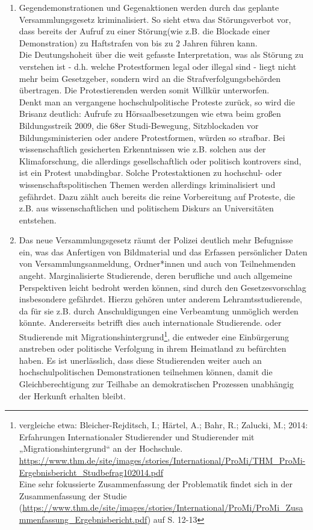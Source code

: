 \documentclass[DIV=calc]{scrartcl}
\let\oldgrqq=\grqq
\def\grqq{\oldgrqq\xspace}
\begin{document}
\begin{enumerate}
\item Gegendemonstrationen und Gegenaktionen werden durch das geplante Versammlungsgesetz kriminalisiert. So sieht etwa das \glqq Störungsverbot\grqq vor, dass bereits der Aufruf zu einer \glqq Störung\grqq (wie z.B. die Blockade einer Demonstration) zu Haftstrafen von bis zu 2 Jahren führen kann.\\
Die Deutungshoheit über die weit gefasste Interpretation, was als Störung zu verstehen ist - d.h. welche Protestformen legal oder illegal sind - liegt nicht mehr beim Gesetzgeber, sondern wird an die Strafverfolgungsbehörden übertragen. Die Protestierenden werden somit Willkür unterworfen.\\ 
Denkt man an vergangene hochschulpolitische Proteste zurück, so wird die Brisanz deutlich: Aufrufe zu Hörsaalbesetzungen wie etwa beim großen Bildungsstreik 2009, die 68er Studi-Bewegung, Sitzblockaden vor Bildungsministerien oder andere Protestformen, würden so strafbar.  Bei wissenschaftlich gesicherten Erkenntnissen wie z.B. solchen aus der Klimaforschung, die allerdings gesellschaftlich oder politisch kontrovers sind, ist ein Protest unabdingbar. Solche Protestaktionen zu hochschul- oder wissenschaftspolitischen Themen werden allerdings kriminalisiert und gefährdet. Dazu zählt auch bereits die reine Vorbereitung auf Proteste, die z.B. aus wissenschaftlichen und politischem Diskurs an Universitäten entstehen. \newpage
\item Das neue Versammlungsgesetz räumt der Polizei deutlich mehr Befugnisse ein, was das Anfertigen von Bildmaterial und das Erfassen persönlicher Daten von Versammlungsanmeldung, Ordner*innen und auch von Teilnehmenden angeht. Marginalisierte Studierende, deren berufliche und auch allgemeine Perspektiven leicht bedroht werden können, sind durch den Gesetzesvorschlag insbesondere gefährdet. Hierzu gehören unter anderem Lehramtsstudierende, da für sie z.B. durch Anschuldigungen eine Verbeamtung unmöglich werden könnte. Andererseits betrifft dies auch internationale Studierende. oder Studierende mit Migrationshintergrund\footnote{vergleiche etwa: Bleicher-Rejditsch, I.; Härtel, A.; Bahr, R.; Zalucki, M.; 2014: Erfahrungen Internationaler Studierender und Studierender mit „Migrationshintergrund“ an der Hochschule. \url{https://www.thm.de/site/images/stories/International/ProMi/THM_ProMi-Ergebnisbericht_Studbefrag102014.pdf} \\ Eine sehr fokussierte Zusammenfassung der Problematik findet sich in der Zusammenfassung der Studie (\url{https://www.thm.de/site/images/stories/International/ProMi/ProMi_Zusammenfassung_Ergebnisbericht.pdf}) auf S. 12-13}, die entweder eine Einbürgerung anstreben oder politische Verfolgung in ihrem Heimatland zu befürchten haben. Es ist unerlässlich, dass diese Studierenden weiter auch an hochschulpolitischen Demonstrationen teilnehmen können, damit die Gleichberechtigung zur Teilhabe an demokratischen Prozessen unabhängig der Herkunft erhalten bleibt.

\end{enumerate}
\end{document}
